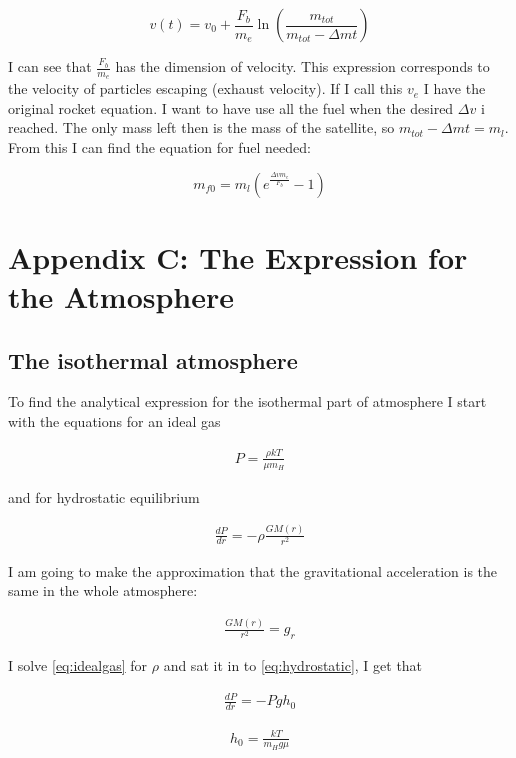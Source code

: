 \documentclass[a4paper, 10pt]{article}
\begin{document}
\begin{equation}
v(t) =v_0 + \frac{F_b}{m_e} \ln \left(\frac{m_{tot}}{m_{tot} - \Delta m t} \right)
\end{equation}

I can see that $\frac{F_b}{m_e}$ has the dimension of velocity. This expression corresponds to the velocity of particles escaping (exhaust velocity). If I call this $v_e$ I have the original rocket equation. I want to have use all the fuel when the desired $\Delta v$ i reached. The only mass left then is the mass of the satellite, so $m_{tot} - \Delta m t = m_l$. From this I can find the equation for fuel needed:

\begin{equation}
m_{f0} = m_l(e^{\frac{\Delta v m_e}{F_b}} - 1)
\end{equation}


\section{Appendix C: The Expression for the Atmosphere}\label{sec:atmosphere}
\subsection{The isothermal atmosphere}
To find the analytical expression for the isothermal part of atmosphere I start with the equations for an ideal gas \cite{1e}

\begin{align}\label{eq:idealgas}
P = \frac{\rho kT}{\mu m_H}
\end{align}

and for hydrostatic equilibrium 

\begin{align}\label{eq:hydrostatic}
\frac{dP}{dr} = -\rho \frac{GM(r)}{r^2}
\end{align}

I am going to make the approximation that the gravitational acceleration is the same in the whole atmosphere:

\begin{align}
\frac{GM(r)}{r^2} = g_r
\end{align}

I solve \ref{eq:idealgas} for $\rho$ and sat it in to \ref{eq:hydrostatic}, I get that

\begin{align}
\frac{dP}{dr} = -Pg h_0
\end{align}

\begin{align}
h_0 = \frac{kT}{m_H g \mu}
\end{align}
\end{document}
